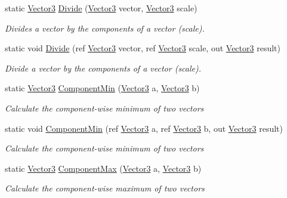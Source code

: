 \begin{DoxyCompactItemize}
static \hyperlink{struct_open_t_k_1_1_vector3}{Vector3} \hyperlink{struct_open_t_k_1_1_vector3_ad5ee6385017e0095d0c1f94e58cef029}{Divide} (\hyperlink{struct_open_t_k_1_1_vector3}{Vector3} vector, \hyperlink{struct_open_t_k_1_1_vector3}{Vector3} scale)
\begin{DoxyCompactList}\small\item\em Divides a vector by the components of a vector (scale). \end{DoxyCompactList}\item 
static void \hyperlink{struct_open_t_k_1_1_vector3_a1bc73df1c6ad3b74f5dab8783b0f9923}{Divide} (ref \hyperlink{struct_open_t_k_1_1_vector3}{Vector3} vector, ref \hyperlink{struct_open_t_k_1_1_vector3}{Vector3} scale, out \hyperlink{struct_open_t_k_1_1_vector3}{Vector3} result)
\begin{DoxyCompactList}\small\item\em Divide a vector by the components of a vector (scale). \end{DoxyCompactList}\item 
static \hyperlink{struct_open_t_k_1_1_vector3}{Vector3} \hyperlink{struct_open_t_k_1_1_vector3_aa559e03d19cbf7f4dc1a212c841eac9d}{Component\-Min} (\hyperlink{struct_open_t_k_1_1_vector3}{Vector3} a, \hyperlink{struct_open_t_k_1_1_vector3}{Vector3} b)
\begin{DoxyCompactList}\small\item\em Calculate the component-\/wise minimum of two vectors \end{DoxyCompactList}\item 
static void \hyperlink{struct_open_t_k_1_1_vector3_a365a6b79964ba5e8cad45c65b9cd0730}{Component\-Min} (ref \hyperlink{struct_open_t_k_1_1_vector3}{Vector3} a, ref \hyperlink{struct_open_t_k_1_1_vector3}{Vector3} b, out \hyperlink{struct_open_t_k_1_1_vector3}{Vector3} result)
\begin{DoxyCompactList}\small\item\em Calculate the component-\/wise minimum of two vectors \end{DoxyCompactList}\item 
static \hyperlink{struct_open_t_k_1_1_vector3}{Vector3} \hyperlink{struct_open_t_k_1_1_vector3_a646d40afcf3c984bc0cfeb91973f7509}{Component\-Max} (\hyperlink{struct_open_t_k_1_1_vector3}{Vector3} a, \hyperlink{struct_open_t_k_1_1_vector3}{Vector3} b)
\begin{DoxyCompactList}\small\item\em Calculate the component-\/wise maximum of two vectors \end{DoxyCompactList}\item 

\end{DoxyCompactItemize}
